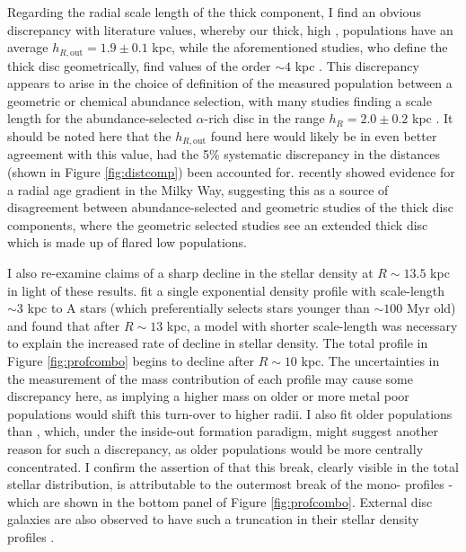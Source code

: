 Regarding the radial scale length of the thick component, I find an obvious discrepancy with literature values, whereby our thick, high \afe{}, populations have an average $h_{R, \text{out}} = 1.9 \pm 0.1  $ kpc, while the aforementioned studies, who define the thick disc geometrically, find values of the order $\sim 4$ kpc \citep{2001MNRAS.322..426O,2008ApJ...673..864J}. This discrepancy appears to arise in the choice of definition of the measured population between a geometric or chemical abundance selection, with many studies finding a scale length for the abundance-selected $\alpha$-rich disc in the range $h_R = 2.0 \pm 0.2$ kpc \citep{2016ARA&A..54..529B,2016ApJ...823...30B,2012ApJ...753..148B,2012ApJ...752...51C}. It should be noted here that the $h_{R, \text{out}}$ found here would likely be in even better agreement with this value, had the 5\% systematic discrepancy in the distances (shown in Figure \ref{fig:distcomp}) been accounted for. \citet{2016arXiv160901168M} recently showed evidence for a radial age gradient in the Milky Way, suggesting this as a source of disagreement between abundance-selected and geometric studies of the thick disc components, where the geometric selected studies see an extended thick disc which is made up of flared low \afe{} populations. 

I also re-examine claims of a sharp decline in the stellar density at $R\sim 13.5$ kpc \citep[e.g.][]{2009A&A...495..819R,2010MNRAS.402..713S} in light of these results. \citet{2010MNRAS.402..713S} fit a single exponential density profile with scale-length $\sim 3$ kpc to A stars (which preferentially selects stars younger than $\sim 100$ Myr old) and found that after $R\sim13$ kpc, a model with shorter scale-length was necessary to explain the increased rate of decline in stellar density. The total profile in Figure \ref{fig:profcombo} begins to decline after $R\sim10$ kpc. The uncertainties in the measurement of the mass contribution of each profile may cause some discrepancy here, as implying a higher mass on older or more metal poor populations would shift this turn-over to higher radii. I also fit older populations than \citet{2010MNRAS.402..713S}, which, under the inside-out formation paradigm, might suggest another reason for such a discrepancy, as older populations would be more centrally concentrated. I confirm the assertion of \citet{2016ApJ...823...30B} that this break, clearly visible in the total stellar distribution, is attributable to the outermost break of the mono-\feh{} profiles - which are shown in the bottom panel of Figure \ref{fig:profcombo}. External disc galaxies are also observed to have such a truncation in their stellar density profiles \citep[e.g.][]{2006A&A...454..759P}. 


